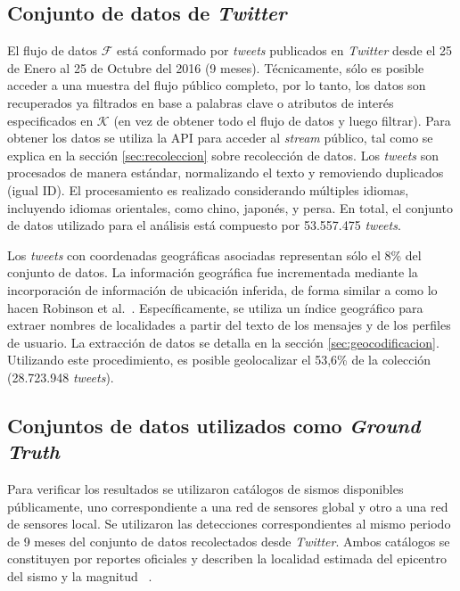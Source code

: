	\subsection{Conjunto de datos de \textit{Twitter}}
	
		El flujo de datos $\mathcal{F}$ está conformado por \textit{tweets} publicados en \textit{Twitter} desde el 25 de Enero al 25 de Octubre del 2016 (9 meses). Técnicamente, sólo es posible acceder a una muestra del flujo público completo, por lo tanto, los datos son recuperados ya filtrados en base a palabras clave o atributos de interés especificados en $\mathcal{K}$ (en vez de obtener todo el flujo de datos y luego filtrar).  Para obtener los datos se utiliza la API para acceder al \textit{stream} público, tal como se explica en la sección \ref{sec:recoleccion} sobre recolección de datos. Los \textit{tweets} son procesados de manera estándar, normalizando el texto y removiendo duplicados (igual ID). El procesamiento es realizado considerando múltiples idiomas, incluyendo idiomas orientales, como chino, japonés, y persa. En total, el conjunto de datos utilizado para el análisis está compuesto por 53.557.475 \textit{tweets}.
		
		Los \textit{tweets} con coordenadas geográficas asociadas representan sólo el 8\% del conjunto de datos. La información geográfica fue incrementada mediante la incorporación de información de ubicación inferida, de forma similar a como lo hacen Robinson et al.~\cite{robinson2013sensitive}. Específicamente, se utiliza un índice geográfico para extraer nombres de localidades a partir del texto de los mensajes y de los perfiles de usuario. La extracción de datos se detalla en la sección \ref{sec:geocodificacion}. Utilizando este procedimiento, es posible geolocalizar el 53,6\% de la colección (28.723.948 \textit{tweets}).
		
	\subsection{Conjuntos de datos utilizados como \textit{Ground Truth}}
	
		Para verificar los resultados se utilizaron catálogos de sismos disponibles públicamente, uno correspondiente a una red de sensores global y otro a una red de sensores local. Se utilizaron las detecciones correspondientes al mismo periodo de 9 meses del conjunto de datos recolectados desde \textit{Twitter}. Ambos catálogos se constituyen por reportes oficiales y describen la localidad estimada del epicentro del sismo y la magnitud ~\cite{usgs:magnitude}.
		
